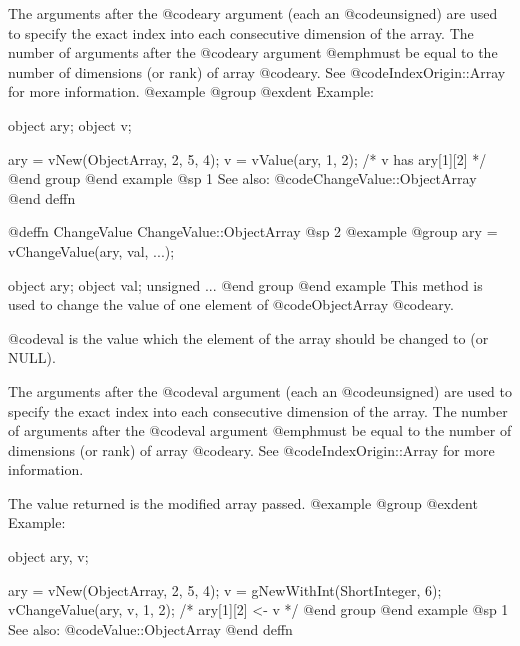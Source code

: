 The arguments after the @code{ary} argument (each an @code{unsigned})
are used to specify the exact index into each consecutive dimension of
the array.  The number of arguments after the @code{ary} argument
@emph{must} be equal to the number of dimensions (or rank) of array
@code{ary}.  See @code{IndexOrigin::Array} for more information.
@example
@group
@exdent Example:

object  ary;
object  v;

ary = vNew(ObjectArray, 2, 5, 4);
v = vValue(ary, 1, 2);
/*  v has ary[1][2]  */
@end group
@end example
@sp 1
See also:  @code{ChangeValue::ObjectArray}
@end deffn








@deffn {ChangeValue} ChangeValue::ObjectArray
@sp 2
@example
@group
ary = vChangeValue(ary, val, ...);

object    ary;
object    val;
unsigned  ...
@end group
@end example
This method is used to change the value of one element of
@code{ObjectArray} @code{ary}.

@code{val} is the value which the element of the array should be changed
to (or NULL).

The arguments after the @code{val} argument (each an @code{unsigned})
are used to specify the exact index into each consecutive dimension of
the array.  The number of arguments after the @code{val} argument
@emph{must} be equal to the number of dimensions (or rank) of array
@code{ary}.  See @code{IndexOrigin::Array} for more information.

The value returned is the modified array passed.
@example
@group
@exdent Example:

object  ary, v;

ary = vNew(ObjectArray, 2, 5, 4);
v = gNewWithInt(ShortInteger, 6);
vChangeValue(ary, v, 1, 2);
/*  ary[1][2] <- v  */
@end group
@end example
@sp 1
See also:  @code{Value::ObjectArray}
@end deffn









